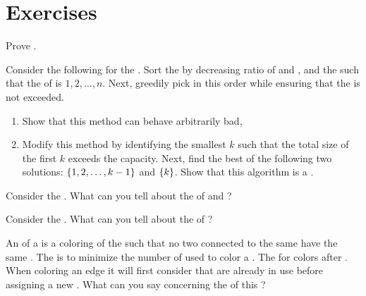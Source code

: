 \section*{Exercises}
\begin{exercise}
Prove .
\end{exercise}

\begin{exercise}
Consider the following  for the . Sort the  by decreasing ratio of  and , and  the  such that the  of  is $1,2,\ldots,n$. Next, greedily pick  in this order while ensuring that the  is not exceeded.
\begin{enumerate}
 \item Show that this method can behave arbitrarily bad,
 \item Modify this method by identifying the smallest $k$ such that the total size of the first $k$  exceeds the capacity. Next, find the best of the following two solutions: $\left\{ 1,2,\ldots,k-1 \right\}$ and $\left\{ k \right\}$.
Show that this algorithm is a .
\end{enumerate}
\end{exercise}

\begin{exercise}
Consider the . What can you tell about the  of  and ?
\end{exercise}

\begin{exercise}
Consider the . What can you tell about the  of ?
\end{exercise}

\begin{exercise}
An  of a  is a coloring of the  such that no two  connected to the same  have the same . The  is to minimize the number of  used to color a . The  for  colors  after . When coloring an edge it will first consider  that are already in use before assigning a new . What can you say concerning the  of this ?
\end{exercise}

